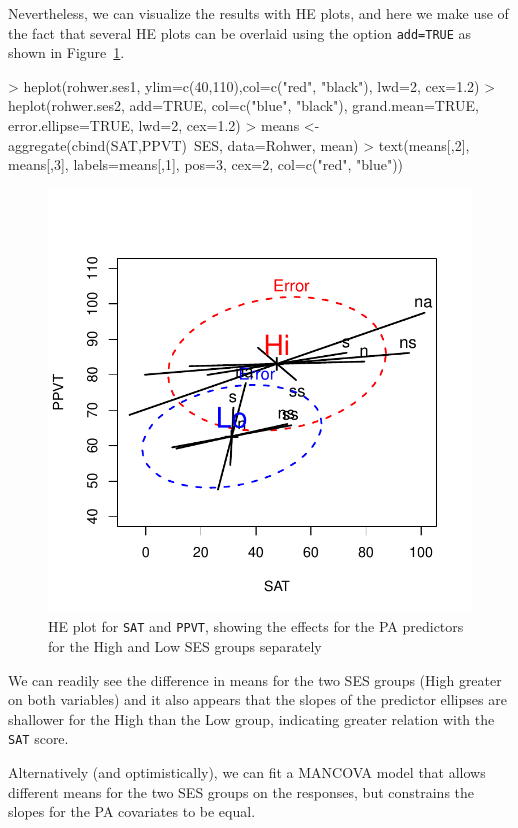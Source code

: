 \documentclass[11pt]{article}
\newcommand{\figref}[1]{Figure~\ref{#1}}
\newcommand{\code}[1]{{\texttt{#1}}}
\begin{document}
Nevertheless, we can visualize the results with HE plots, and here we make use of the fact
that several HE plots can be overlaid using the option \code{add=TRUE}
as shown in \figref{fig:rohwer-HE1}.
\begin{Schunk}
\begin{Sinput}
> heplot(rohwer.ses1, ylim=c(40,110),col=c("red", "black"), lwd=2, cex=1.2)
> heplot(rohwer.ses2, add=TRUE, col=c("blue", "black"), grand.mean=TRUE, error.ellipse=TRUE, lwd=2, cex=1.2)
> means <- aggregate(cbind(SAT,PPVT)~SES, data=Rohwer,  mean)
> text(means[,2], means[,3], labels=means[,1], pos=3, cex=2, col=c("red", "blue"))
\end{Sinput}
\end{Schunk}
\begin{figure}[htb]
\begin{center}
	\includegraphics[width=.6\textwidth, trim=0 30 0 30]{fig/plot-rohwer-HE1}
\caption{HE plot for \code{SAT} and \code{PPVT}, showing the effects for the PA predictors
	for the High and Low SES groups separately}
\label{fig:rohwer-HE1}
\end{center}
\end{figure}

We can readily see the difference in means for the two SES groups (High greater on both variables)
and it also appears that the slopes of the predictor ellipses are shallower for the High
than the Low group, indicating greater relation with the \code{SAT} score. 

Alternatively (and optimistically), we can fit a MANCOVA model 
that allows different means for the two SES groups on the responses, but constrains the
slopes for the PA covariates to be equal.
\end{document}
